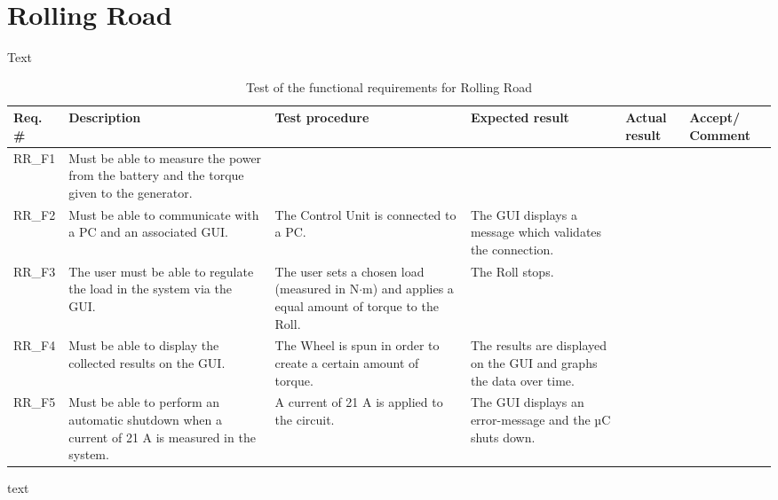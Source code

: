 \section{Rolling Road}
Text

\begin{table}[h!]
	\centering
	\label{my-label}
	\begin{tabular}{|p{1.5 cm}|p{2.1 cm}|p{2.1 cm}|p{2.1 cm}|p{2.1 cm}|p{2.1 cm}|}
		\hline
		\textbf{Req. \#} & \textbf{Description} & \textbf{Test procedure} & 
		\textbf{Expected result} & \textbf{Actual result} & \textbf{Accept/ Comment} \\ \hline
		RR\_F1  
			& Must be able to measure the power from the battery and the torque given to the generator. 
			& 
			&
			&
			& \\ \hline
		RR\_F2 
			& Must be able to communicate with a PC and an associated GUI.
			& The Control Unit is connected to a PC.
			& The GUI displays a message which validates the connection.
			&
			& \\ \hline
		RR\_F3
			& The user must be able to regulate the load in the system via the GUI.
			& The user sets a chosen load (measured in N$\cdot$m) and applies a equal amount of torque to the Roll.
			& The Roll stops.
			& 
			& \\ \hline
		RR\_F4 
			& Must be able to display the collected results on the GUI.
			& The Wheel is spun in order to create a certain amount of torque.
			& The results are displayed on the GUI and graphs the data over time.
			& 
			& \\ \hline
		RR\_F5 
			& Must be able to perform an automatic shutdown when a current of 21 A is measured in the system.
			& A current of 21 A is applied to the circuit.
			& The GUI displays an error-message and the µC shuts down.
			&
			& \\ \hline
	\end{tabular}
	\caption{Test of the functional requirements for Rolling Road}
\end{table}

text

